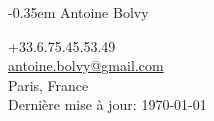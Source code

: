 \documentclass[
  french,
  a4paper
]{resume-openfont}
\begin{document}
\noindent%
\begin{minipage}{.5\textwidth}
\kern-0.35em
{
  \fontsize{28pt}{28pt}
  \selectfont Antoine Bolvy\\
}
\vspace{5pt}


\end{minipage}%
\begin{minipage}{.5\textwidth}
\begin{flushright}
\color{headings}+33.6.75.45.53.49\\
\href{mailto:antoine.bolvy@gmail.com}{antoine.bolvy@gmail.com}\\
Paris, France\\
{\color{date}\fontsize{7pt}{12pt}\selectfont{}Dernière mise à jour: \today}
\end{flushright}
\end{minipage}

\noindent\makebox[\linewidth]{
{\color{headingsrulegray}\rule{\paperwidth}{0.4pt}}}
\vspace{-18pt}

%
%
\end{document}
